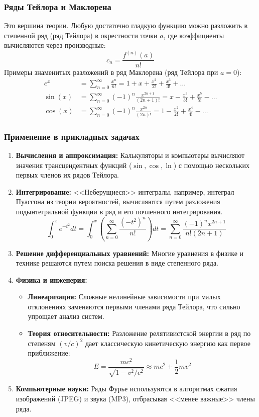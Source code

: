 \documentclass[a4paper, 12pt]{report}
\numberwithin{equation}{section}
\begin{document}
\subsubsection{Ряды Тейлора и Маклорена}
Это вершина теории. Любую достаточно гладкую функцию можно разложить в степенной ряд (ряд Тейлора) в окрестности точки $a$, где коэффициенты вычисляются через производные:
$$ c_n = \frac{f^{(n)}(a)}{n!} $$
Примеры знаменитых разложений в ряд Маклорена (ряд Тейлора при $a=0$):
\begin{align*}
	e^x &= \sum_{n=0}^{\infty} \frac{x^n}{n!} = 1 + x + \frac{x^2}{2!} + \frac{x^3}{3!} + \dots \\
	\sin(x) &= \sum_{n=0}^{\infty} (-1)^n \frac{x^{2n+1}}{(2n+1)!} = x - \frac{x^3}{3!} + \frac{x^5}{5!} - \dots \\
	\cos(x) &= \sum_{n=0}^{\infty} (-1)^n \frac{x^{2n}}{(2n)!} = 1 - \frac{x^2}{2!} + \frac{x^4}{4!} - \dots
\end{align*}

\subsubsection{Применение в прикладных задачах}
\begin{enumerate}
	\item \textbf{Вычисления и аппроксимация:} Калькуляторы и компьютеры вычисляют значения трансцендентных функций ($\sin, \cos, \ln$) с помощью нескольких первых членов их рядов Тейлора.
	
	\item \textbf{Интегрирование:} <<Неберущиеся>> интегралы, например, интеграл Пуассона из теории вероятностей, вычисляются путем разложения подынтегральной функции в ряд и его почленного интегрирования.
	$$ \int_{0}^{x} e^{-t^2} dt = \int_{0}^{x} \left( \sum_{n=0}^{\infty} \frac{(-t^2)^n}{n!} \right) dt = \sum_{n=0}^{\infty} \frac{(-1)^n x^{2n+1}}{n! (2n+1)} $$
	
	\item \textbf{Решение дифференциальных уравнений:} Многие уравнения в физике и технике решаются путем поиска решения в виде степенного ряда.
	
	\item \textbf{Физика и инженерия:}
	\begin{itemize}
		\item \textbf{Линеаризация:} Сложные нелинейные зависимости при малых отклонениях заменяются первыми членами ряда Тейлора, что сильно упрощает анализ систем.
		\item \textbf{Теория относительности:} Разложение релятивистской энергии в ряд по степеням $(v/c)^2$ дает классическую кинетическую энергию как первое приближение:
		$$ E = \frac{mc^2}{\sqrt{1-v^2/c^2}} \approx mc^2 + \frac{1}{2}mv^2 $$
	\end{itemize}
	
	\item \textbf{Компьютерные науки:} Ряды Фурье используются в алгоритмах сжатия изображений (JPEG) и звука (MP3), отбрасывая <<менее важные>> члены ряда.
\end{enumerate}
\end{document}

